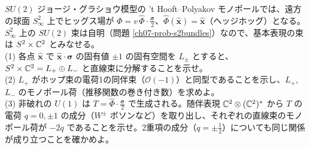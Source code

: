 \begin{problem}[難易度 B]\label{ch07-prob-adjhiggs}
$SU(2)$ ジョージ・グラショウ模型の 't Hooft--Polyakov モノポールでは、遠方の球面 $S^2_\infty$ 上でヒッグス場が $\Phi=v\,\hat\Phi\cdot\tfrac{\bm\sigma}2$、$\hat\Phi(\hat{\bm x})=\hat{\bm x}$（ヘッジホッグ）となる。$S^2_\infty$ 上の $SU(2)$ 束は自明（問題 \ref{ch07-prob-s2bundles}）なので、基本表現の束は $S^2\times\mathbb{C}^2$ とみなせる。\\
(1) 各点 $\hat{\bm x}$ で $\hat{\bm x}\cdot\bm\sigma$ の固有値 $\pm1$ の固有空間を $L_\pm$ とすると、$S^2\times\mathbb{C}^2=L_+\oplus L_-$ と直線束に分解することを示せ。\\
(2) $L_+$ がホップ束の電荷1の同伴束（$\mathcal O(-1)$）と同型であることを示し、$L_+$, $L_-$ のモノポール荷（推移関数の巻き付き数）を求めよ。\\
(3) 非破れの $U(1)$ は $T=\hat\Phi\cdot\frac{\bm\sigma}2$ で生成される。随伴表現 $\mathbb{C}^2\otimes(\mathbb{C}^2)^*$ から $T$ の電荷 $q=0,\pm1$ の成分（$W^\pm$ ボソンなど）を取り出し、それぞれの直線束のモノポール荷が $-2q$ であることを示せ。2重項の成分（$q=\pm\frac12$）についても同じ関係が成り立つことを確かめよ。
\end{problem}

